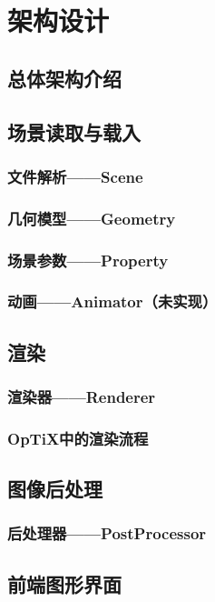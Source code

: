 \chapter{架构设计}
\label{cha:pipeline}

\section{总体架构介绍}

\section{场景读取与载入}
\subsection{文件解析——Scene}
\subsection{几何模型——Geometry}
\subsection{场景参数——Property}
\subsection{动画——Animator（未实现）}

\section{渲染}
\subsection{渲染器——Renderer}
\subsection{OpTiX中的渲染流程}

\section{图像后处理}
\subsection{后处理器——PostProcessor}

\section{前端图形界面}

